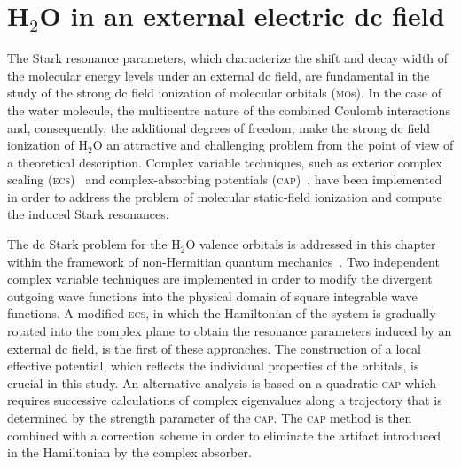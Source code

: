 \chapter{H$_{2}$O in an external electric dc field}
\label{ch:dc_h2o}



The Stark resonance parameters, which characterize the shift and decay
width of the molecular energy levels under an external dc field, are
fundamental in the study of the strong dc field ionization of
molecular orbitals (\textsc{mo}s). In the case of the water molecule,
the multicentre nature of the combined Coulomb interactions and,
consequently, the additional degrees of freedom, make the strong dc
field ionization of H$_{2}$O an attractive and challenging problem
from the point of view of a theoretical description.
Complex variable techniques, such as exterior complex scaling
(\textsc{ecs})~\cite{Simon_1979,ecsScrinzi} and complex-absorbing
potentials (\textsc{cap})~\cite{RissMeyer_1993,Krause_2014}, have been
implemented in order to address the problem of molecular static-field
ionization and compute the induced Stark resonances.

The dc Stark problem for the H$_{2}$O valence orbitals is addressed in
this chapter within the framework of non-Hermitian quantum
mechanics~\cite{Moiseyev_NHQM}. Two independent complex variable
techniques are implemented in order to modify the divergent outgoing
wave functions into the physical domain of square integrable wave
functions. A modified \textsc{ecs}, in which the Hamiltonian of the
system is gradually rotated into the complex plane to obtain the
resonance parameters induced by an external dc field, is the first of
these approaches. The construction of a local effective potential,
which reflects the individual properties of the orbitals, is crucial
in this study. An alternative analysis is based on a quadratic
\textsc{cap} which requires successive calculations of complex
eigenvalues along a trajectory that is determined by the strength
parameter of the \textsc{cap}. The \textsc{cap} method is then
combined with a correction scheme in order to eliminate the artifact
introduced in the Hamiltonian by the complex absorber.

